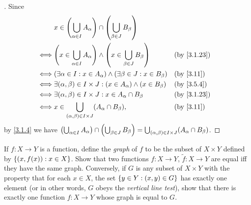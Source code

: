\begin{proof}[]
	Since
	\begin{align*}
		     & x \in \pa{\bigcup_{\alpha \in I} A_\alpha} \cap \pa{\bigcup_{\beta \in J} B_\beta}                         \\
		\iff & \pa{x \in \bigcup_{\alpha \in I} A_\alpha} \land \pa{x \in \bigcup_{\beta \in J} B_\beta} &  & \by{3.1.23} \\
		\iff & \pa{\exists \alpha \in I : x \in A_\alpha} \land \pa{\exists \beta \in J : x \in B_\beta} &  & \by{3.11}   \\
		\iff & \exists (\alpha, \beta) \in I \times J : (x \in A_\alpha) \land (x \in B_\beta)           &  & \by{3.5.4}  \\
		\iff & \exists (\alpha, \beta) \in I \times J : x \in A_\alpha \cap B_\beta                      &  & \by{3.1.23} \\
		\iff & x \in \bigcup_{(\alpha, \beta) \in I \times J} (A_\alpha \cap B_\beta),                   &  & \by{3.11}
	\end{align*}
	by \cref{3.1.4} we have \(\left\lparen\bigcup_{\alpha \in I} A_\alpha\right\rparen \cap \left\lparen\bigcup_{\beta \in J} B_\beta\right\rparen = \bigcup_{(\alpha, \beta) \in I \times J} (A_\alpha \cap B_\beta)\).
\end{proof}

\begin{ex}\label{ex:3.5.10}
	If \(f : X \to Y\) is a function, define the \emph{graph} of \(f\) to be the subset of \(X \times Y\) defined by \(\left\lbrace(x, f(x)) : x \in X\right\rbrace\).
	Show that two functions \(f : X \to Y\), \(\tilde{f} : X \to Y\) are equal iff they have the same graph.
	Conversely, if \(G\) is any subset of \(X \times Y\) with the property that for each \(x \in X\), the set \(\left\lbrace y \in Y : (x, y) \in G\right\rbrace\) has exactly one element (or in other words, \(G\) obeys the \emph{vertical line test}), show that there is exactly one function \(f : X \to Y\) whose graph is equal to \(G\).
\end{ex}

